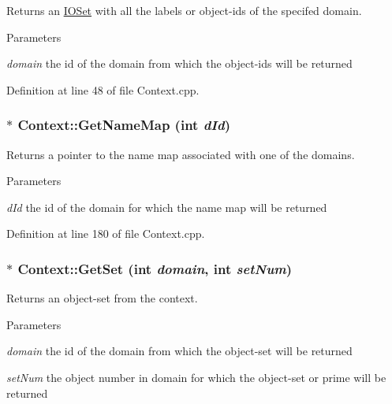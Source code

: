 Returns an \hyperlink{class_i_o_set}{IOSet} with all the labels or object-\/ids of the specifed domain. 


\begin{DoxyParams}{Parameters}
\item[{\em domain}]the id of the domain from which the object-\/ids will be returned \end{DoxyParams}


Definition at line 48 of file Context.cpp.

\hypertarget{class_context_af00dbb1f5b5fa02eea8e2e326e297bb9}{
\subsubsection[{GetNameMap}]{ $\ast$ Context::GetNameMap (int {\em dId})}}
\label{class_context_af00dbb1f5b5fa02eea8e2e326e297bb9}


Returns a pointer to the name map associated with one of the domains. 


\begin{DoxyParams}{Parameters}
\item[{\em dId}]the id of the domain for which the name map will be returned \end{DoxyParams}


Definition at line 180 of file Context.cpp.

\hypertarget{class_context_adeeca59fd329ad829de527c37489e7b8}{
\subsubsection[{GetSet}]{ $\ast$ Context::GetSet (int {\em domain}, \/  int {\em setNum})}}
\label{class_context_adeeca59fd329ad829de527c37489e7b8}


Returns an object-\/set from the context. 


\begin{DoxyParams}{Parameters}
\item[{\em domain}]the id of the domain from which the object-\/set will be returned \item[{\em setNum}]the object number in domain for which the object-\/set or prime will be returned \end{DoxyParams}


